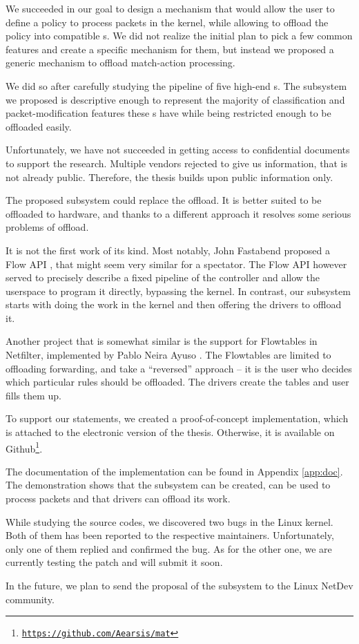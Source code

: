 
We succeeded in our goal to design a mechanism that would allow the user to
define a policy to process packets in the kernel, while allowing to offload the
policy into compatible s. We did not realize the initial plan to pick
a few common features and create a specific mechanism for them, but instead we
proposed a generic mechanism to offload match-action processing.

We did so after carefully studying the pipeline of five high-end s.
The subsystem we proposed is descriptive enough to represent the majority of
classification and packet-modification features these s have while
being restricted enough to be offloaded easily.

Unfortunately, we have not succeeded in getting access to confidential
documents to support the research. Multiple vendors rejected to give us
information, that is not already public. Therefore, the thesis builds upon
public information only.

The proposed subsystem could replace the  offload. It is better suited to be
offloaded to hardware, and thanks to a different approach it resolves some
serious problems of  offload.

It is not the first work of its kind. Most notably, John Fastabend proposed
a Flow API \cite{flow-api}, that might seem very similar for a spectator. The
Flow API however served to precisely describe a fixed pipeline of the
controller and allow the userspace to program it directly, bypassing the
kernel. In contrast, our subsystem starts with doing the work in the kernel and
then offering the drivers to offload it.

Another project that is somewhat similar is the support for Flowtables in
Netfilter, implemented by Pablo Neira Ayuso \cite{flowtables}. The Flowtables
are limited to offloading forwarding, and take a ``reversed'' approach -- it is
the user who decides which particular rules should be offloaded. The drivers
create the tables and user fills them up.

To support our statements, we created a proof-of-concept implementation, which
is attached to the electronic version of the thesis. Otherwise, it is available
on Github\footnote{\href{https://github.com/Aearsis/mat}{\texttt{https://github.com/Aearsis/mat}}}.

The documentation of the implementation can be found in Appendix
\ref{app:doc}. The demonstration shows that the subsystem can be created, can
be used to process packets and that drivers can offload its work.

While studying the source codes, we discovered two bugs in the Linux kernel.
Both of them has been reported to the respective maintainers. Unfortunately,
only one of them replied and confirmed the bug. As for the other one, we are
currently testing the patch and will submit it soon.

In the future, we plan to send the proposal of the subsystem to the Linux
NetDev community.
